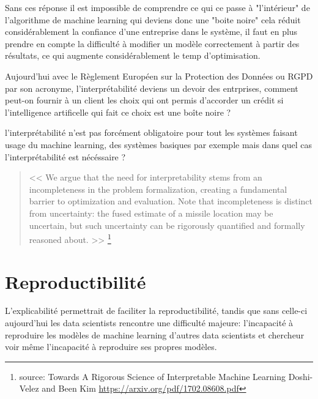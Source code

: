             Sans ces réponse il est impossible de comprendre ce qui ce passe à "l'intérieur"
            de l'algorithme de machine learning qui deviens donc une "boite noire"
            cela réduit considérablement la confiance d'une entreprise dans le système,
            il faut en plus prendre en compte la difficulté à modifier un modèle correctement à 
            partir des résultats, ce qui augmente considérablement le temp d'optimisation.
            \newline

            Aujourd'hui avec le Règlement Européen sur la Protection des Données ou RGPD par son 
            acronyme, l'interprétabilité deviens un devoir des entrprises, comment 
            peut-on fournir à un client les choix qui ont permis d'accorder un crédit
            si l'intelligence artificelle qui fait ce choix est une boîte noire ?


            l'interprétabilité n'est pas forcément obligatoire pour tout les systèmes 
            faisant usage du machine learning, des systèmes basiques par exemple 
            mais dans quel cas l'interprétabilité est nécéssaire ?  \newline
    
            \begin{quote}
                << We argue that the need for interpretability
                stems from an incompleteness in the problem formalization, creating a fundamental barrier to
                optimization and evaluation. Note that incompleteness is distinct from uncertainty: the fused
                estimate of a missile location may be uncertain, but such uncertainty can be rigorously quantified
                and formally reasoned about. >>
                \footnote{source: Towards A Rigorous Science of Interpretable Machine Learning \newline
                Doshi-Velez and Been Kim \newline
                \url{https://arxiv.org/pdf/1702.08608.pdf}}
                \newline
            \end{quote}

        \newpage
        \section{Reproductibilité}
        L'explicabilité permettrait de faciliter la reproductibilité, tandis que sans celle-ci 
        aujourd'hui les data scientists rencontre une difficulté majeure: 
        l'incapacité à reproduire les modèles de machine learning d'autres data scientists 
        et chercheur voir même l'incapacité à reproduire ses propres modèles. \newline 
        
